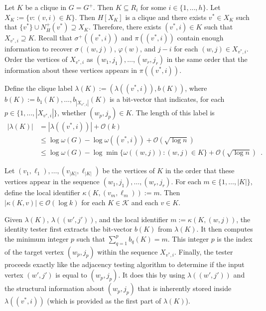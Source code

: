 \documentclass{patmorin}
\renewcommand{\le}{\leqslant}
\newcommand{\Oh}{\calO}
\newcommand{\calK}{\mathcal{K}}
\newcommand{\calO}{\mathcal{O}}
\begin{document}
  Let $K$ be a clique in $G=G^+$.  Then $K\subseteq R_i$ for some $i\in\{1,\ldots,h\}$.  Let $X_K:=\{v: (v,i)\in K\}$.
  Then $H[X_K]$ is a clique and there exists $v^*\in X_K$ such that $\{v^*\}\cup N^+_H(v^*)\supseteq X_K$.
  Therefore, there exists $(v^*,i)\in K$ such that $X_{v^*,i}\supseteq K$. Recall that $\sigma^+((v^*,i))$ and $\pi((v^*,i))$ contain enough information to recover $\sigma((w,j))$, $\varphi(w)$, and $j-i$ for each $(w,j)\in X_{v^*,i}$.
  Order the vertices of $X_{v^*,i}$ as $(w_1,j_1),\ldots,(w_{r},j_r)$ in the same order that the information about these vertices appears in $\pi((v^*,i))$.

  Define the clique label $\lambda(K):=(\lambda((v^*,i)), b(K))$, where $b(K):=b_1(K),\ldots,b_{|X_{v^*,i}|}(K)$ is a bit-vector that indicates, for each $p\in\{1,\ldots,|X_{v^*,i}|\}$, whether $(w_p,j_p)\in K$.
  The length of this label is
  \begin{align*}
     |\lambda(K)|
     & = |\lambda((v^*,i))| + \Oh(k) \\
     & \le \log\omega(G) - \log\omega((v^*,i)) + \Oh(\sqrt{\log n}) \\
     & \le \log\omega(G) - \log\min\{\omega((w,j)):(w,j)\in K\} + \Oh(\sqrt{\log n})  \enspace .
  \end{align*}

  Let $(v_1,\ell_1),\ldots,(v_{|K|},\ell_{|K|})$ be the vertices of $K$ in the order that these vertices appear in the sequence $(w_1,j_1),\ldots,(w_{r},j_r)$.
  For each $m\in\{1,\ldots,|K|\}$, define the local identifier $\kappa(K,(v_m,\ell_m)):= m$.  Then $|\kappa(K,v)|\in \Oh(\log k)$ for each $K\in\calK$ and each $v\in K$.

  Given $\lambda(K)$, $\lambda((w',j'))$, and the local identifier $m := \kappa(K,(w,j))$, the identity tester first extracts the bit-vector $b(K)$ from $\lambda(K)$.
  It then computes the minimum integer $p$ such that $\sum_{q=1}^p b_q(K)=m$.
  This integer $p$ is the index of the target vertex $(w_p, j_p)$ within the sequence $X_{v^*,i}$.
  Finally, the tester proceeds exactly like the adjacency testing algorithm to determine if the input vertex $(w',j')$ is equal to $(w_p,j_p)$. It does this by using $\lambda((w',j'))$ and the structural information about $(w_p,j_p)$ that is inherently stored inside $\lambda((v^*,i))$ (which is provided as the first part of $\lambda(K)$).
\end{document}
